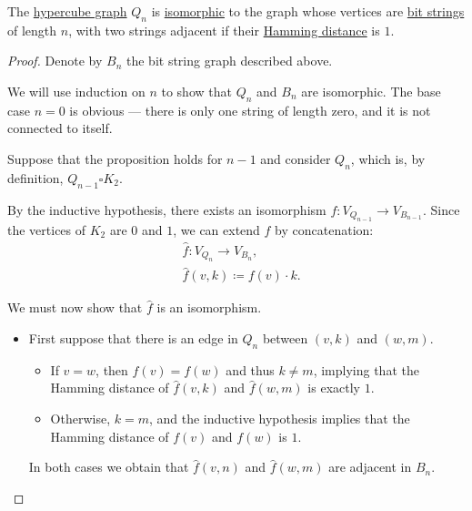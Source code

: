 \begin{proposition}\label{thm:hypercube_graphs_as_strings}
  The \hyperref[def:hypercube_graph]{hypercube graph} \( Q_n \) is \hyperref[def:undirected_graph/morphism]{isomorphic} to the graph whose vertices are \hyperref[def:bit_string]{bit strings} of length \( n \), with two strings adjacent if their \hyperref[def:hamming_distance]{Hamming distance} is \( 1 \).
\end{proposition}
\begin{proof}
  Denote by \( B_n \) the bit string graph described above.

  We will use induction on \( n \) to show that \( Q_n \) and \( B_n \) are isomorphic. The base case \( n = 0 \) is obvious --- there is only one string of length zero, and it is not connected to itself.

  Suppose that the proposition holds for \( n - 1 \) and consider \( Q_n \), which is, by definition, \( Q_{n-1} \square K_2 \).

  By the inductive hypothesis, there exists an isomorphism \( f: V_{Q_{n-1}} \to V_{B_{n-1}} \). Since the vertices of \( K_2 \) are \( 0 \) and \( 1 \), we can extend \( f \) by concatenation:
  \begin{equation*}
    \begin{aligned}
      &\widehat f: V_{Q_n} \to V_{B_n}, \\
      &\widehat f(v, k) \coloneqq f(v) \cdot k.
    \end{aligned}
  \end{equation*}

  We must now show that \( \widehat f \) is an isomorphism.

  \begin{itemize}
    \item First suppose that there is an edge in \( Q_n \) between \( (v, k) \) and \( (w, m) \).
    \begin{itemize}
      \item If \( v = w \), then \( f(v) = f(w) \) and thus \( k \neq m \), implying that the Hamming distance of \( \widehat f(v, k) \) and \( \widehat f(w, m) \) is exactly \( 1 \).

      \item Otherwise, \( k = m \), and the inductive hypothesis implies that the Hamming distance of \( f(v) \) and \( f(w) \) is \( 1 \).
    \end{itemize}

    In both cases we obtain that \( \widehat f(v, n) \) and \( \widehat f(w, m) \) are adjacent in \( B_n \).


\end{itemize}
\end{proof}
